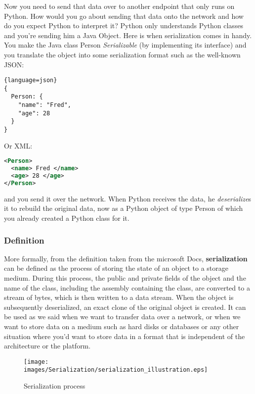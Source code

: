 \documentclass[12pt]{article}
\begin{document}
Now you need to send that data over to another endpoint that only runs on Python. How would you go about sending that data onto the network and how do you expect Python to interpret it? Python only understands Python classes and you’re sending him a Java Object.
Here is when serialization comes in handy. You make the Java class Person \emph{Serializable} (by implementing its interface) and you translate the object into some serialization format such as the well-known JSON:

\begin{lstlisting}{language=json}
{
  Person: {
    "name": "Fred",
    "age": 28 
  }
}
\end{lstlisting}

\hfill\break
Or XML: 

\begin{lstlisting}[language=xml]
<Person>
  <name> Fred </name>
  <age> 28 </age>
</Person>
\end{lstlisting}

and you send it over the network. When Python receives the data, he \emph{deserialize}s it to rebuild the original data, now as a Python object of type Person of which you already created a Python class for it.

\subsubsection{Definition}
More formally, from the definition taken from the microsoft Docs, \textbf{serialization} can be defined as the process of storing the state of an object to a storage medium. During this process, the public and private fields of the object and the name of the class, including the assembly containing the class, are converted to a stream of bytes, which is then written to a data stream. When the object is subsequently deserialized, an exact clone of the original object is created. It can be used as we said when we want to transfer data over a network, or when we want to store data on a medium such as hard disks or databases or any other situation where you’d want to store data in a format that is independent of the architecture or the platform.

\begin{figure}[ht!]
 	\centering
 	\caption{Serialization process}
 	\texttt{[image: images/Serialization/serialization\_illustration.eps]}
 	\label{lab:perceptron}
\end{figure}
\end{document}
